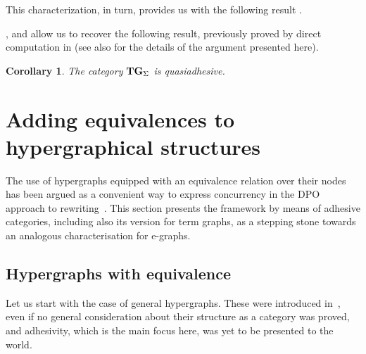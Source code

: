 \documentclass[a4paper,UKenglish,cleveref,pdftex,amsthm,thm-restate,numberwithinsect]{cas-sc}
\theoremstyle{plain}
\newtheorem{lemma}[theorem]{Lemma}
\newtheorem{corollary}[theorem]{Corollary}
\theoremstyle{definition}
\newcommand{\catname}[1]{\textbf{\textup{#1}}}
\newcommand{\hyp}{\catname{Hyp}}
\newcommand{\tg}[0]{\catname{TG}_{\Sigma}}
\begin{document}
This characterization, in turn, provides us with the following result \cite{CastelnovoGM24,castelnovo2023thesis}. 



,  and  allow us to recover the following result, previously proved by direct computation in \cite[Thm.~4.2]{CorradiniG05} (see also \cite[Cor.~5.15]{CastelnovoGM24} for the details of the argument presented here).
\begin{corollary}\label{cor:term}
	The category $\tg$ is quasiadhesive.
\end{corollary}

\section{Adding equivalences to hypergraphical structures}
\label{hypereq}
The use of hypergraphs equipped with an equivalence relation over their nodes has been argued as a convenient way to express concurrency in the DPO approach to rewriting~\cite{concur2006}.
This section presents the framework by means of adhesive categories, including also its version for term graphs, as a stepping stone towards an analogous characterisation for e-graphs.

\subsection{Hypergraphs with equivalence}

Let us start with the case of general hypergraphs. These were introduced in~\cite{concur2006}, even if no general consideration about their structure as a category was proved, and adhesivity, 
which is the main focus here, was yet to be presented to the world.
\end{document}
